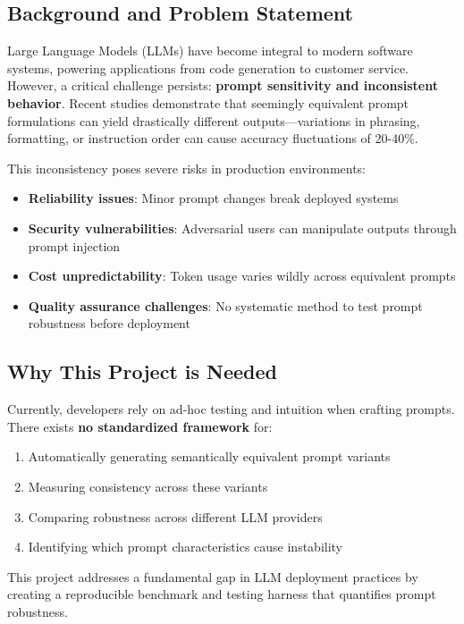 \documentclass[11pt,a4paper]{article}
\begin{document}
\subsection{Background and Problem Statement}

Large Language Models (LLMs) have become integral to modern software systems, powering applications from code generation to customer service. However, a critical challenge persists: \textbf{prompt sensitivity and inconsistent behavior}. Recent studies demonstrate that seemingly equivalent prompt formulations can yield drastically different outputs—variations in phrasing, formatting, or instruction order can cause accuracy fluctuations of 20-40\%.

This inconsistency poses severe risks in production environments:

\begin{itemize}[leftmargin=*]
    \item \textbf{Reliability issues}: Minor prompt changes break deployed systems
    \item \textbf{Security vulnerabilities}: Adversarial users can manipulate outputs through prompt injection
    \item \textbf{Cost unpredictability}: Token usage varies wildly across equivalent prompts
    \item \textbf{Quality assurance challenges}: No systematic method to test prompt robustness before deployment
\end{itemize}

\subsection{Why This Project is Needed}

Currently, developers rely on ad-hoc testing and intuition when crafting prompts. There exists \textbf{no standardized framework} for:

\begin{enumerate}[leftmargin=*]
    \item Automatically generating semantically equivalent prompt variants
    \item Measuring consistency across these variants
    \item Comparing robustness across different LLM providers
    \item Identifying which prompt characteristics cause instability
\end{enumerate}

This project addresses a fundamental gap in LLM deployment practices by creating a reproducible benchmark and testing harness that quantifies prompt robustness.
\end{document}
